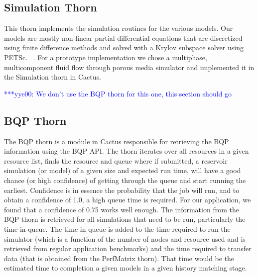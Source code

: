 \documentclass[conference,final]{IEEEtran}
\newcommand{\yyenote}[1]{ {\textcolor{blue} { ***yye00: #1 }}}
\begin{document}

\subsection{Simulation Thorn}

This thorn implements the simulation routines for the various models.
Our models are mostly non-linear partial differential equations that
are discretized using finite difference methods and solved with a
Krylov subspace solver using PETSc. ~\cite{PETSc}. For a prototype
implementation we chose a multiphase, multicomponent fluid flow
through porous media simulator and implemented it in the Simulation
thorn in Cactus.



\yyenote{We don't use the BQP thorn for this one, this section should go
}
\subsection{BQP Thorn}
The BQP thorn is a module in Cactus responsible for retrieving the BQP
information using the BQP API. The thorn iterates over all resources
in a given resource list, finds the resource and queue where if
submitted, a reservoir simulation (or model) of a given size and
expected run time, will have a good chance (or high confidence) of
getting through the queue and start running the earliest. Confidence
is in essence the probability that the job will run, and to obtain a
confidence of 1.0, a high queue time is required. For our application,
we found that a confidence of 0.75 works well enough. The information from the BQP thorn is retrieved for all simulations
that need to be run, particularly the time in queue. The time in queue
is added to the time required to run the simulator (which is a
function of the number of nodes and resource used and is retrieved
from regular application benchmarks) and the time required to transfer
data (that is obtained from the PerfMatrix thorn).  That time would be
the estimated time to completion a given models in a given history
matching stage.
\end{document}
